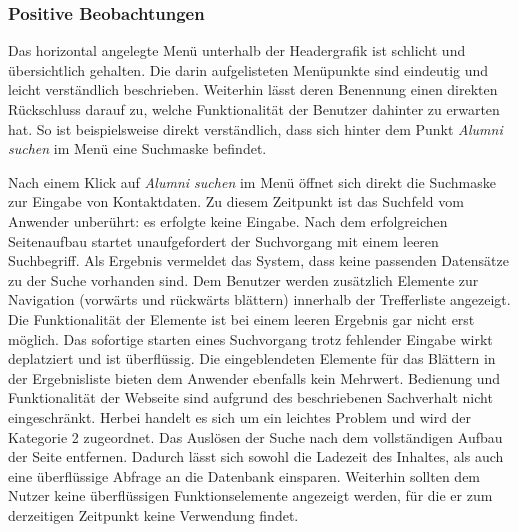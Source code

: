 
\subsubsection*{Positive Beobachtungen}
Das horizontal angelegte Menü unterhalb der Headergrafik ist schlicht und übersichtlich gehalten. Die darin aufgelisteten Menüpunkte sind eindeutig und leicht verständlich beschrieben. Weiterhin lässt deren Benennung einen direkten Rückschluss darauf zu, welche Funktionalität der Benutzer dahinter zu erwarten hat. So ist beispielsweise direkt verständlich, dass sich hinter dem Punkt \emph{Alumni suchen} im Menü eine Suchmaske befindet.

{
	Nach einem Klick auf \emph{Alumni suchen} im Menü öffnet sich direkt die Suchmaske zur Eingabe von Kontaktdaten. Zu diesem Zeitpunkt ist das Suchfeld vom Anwender unberührt: es erfolgte keine Eingabe. Nach dem erfolgreichen Seitenaufbau startet unaufgefordert der Suchvorgang mit einem leeren Suchbegriff. Als Ergebnis vermeldet das System, dass keine passenden Datensätze zu der Suche vorhanden sind. Dem Benutzer werden zusätzlich Elemente zur Navigation (vorwärts und rückwärts blättern) innerhalb der Trefferliste angezeigt. Die Funktionalität der Elemente ist bei einem leeren Ergebnis gar nicht erst möglich.
}
{
	Das sofortige starten eines Suchvorgang trotz fehlender Eingabe wirkt deplatziert und ist überflüssig. Die eingeblendeten Elemente für das Blättern in der Ergebnisliste bieten dem Anwender ebenfalls kein Mehrwert. Bedienung und Funktionalität der Webseite sind aufgrund des beschriebenen Sachverhalt nicht eingeschränkt. Herbei handelt es sich um ein leichtes Problem und wird der Kategorie 2 zugeordnet.
}
{
	Das Auslösen der Suche nach dem vollständigen Aufbau der Seite entfernen. Dadurch lässt sich sowohl die Ladezeit des Inhaltes, als auch eine überflüssige Abfrage an die Datenbank einsparen. Weiterhin sollten dem Nutzer keine überflüssigen Funktionselemente angezeigt werden, für die er zum derzeitigen Zeitpunkt keine Verwendung findet.
} 



